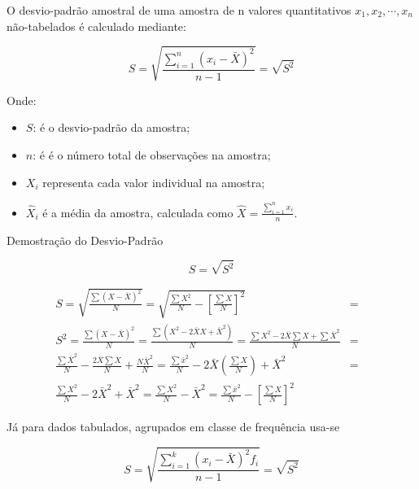 O desvio-padrão amostral de uma amostra de n valores quantitativos $x_{1}, x_{2}, \cdots, x_{n}$ não-tabelados é calculado mediante:

\begin{equation}\label{dp}
    S = \sqrt{\frac{\sum_{i=1}^{n}(x_{i}-\bar{X})^{2}}{n-1}} = \sqrt{S^{2}}
\end{equation}

Onde:

\begin{itemize}
    \item $S$: é o desvio-padrão da amostra;
    \item $n$: é é o número total de observações na amostra;
    \item $X_{i}$ representa cada valor individual na amostra;
    \item $\hat{X}_{i}$ é a média da amostra, calculada como $\hat{X}=\frac{\sum_{i=1}^{n} x_{i}}{n}$.
\end{itemize}
\vskip0.3cm



\newpage
Demostração do Desvio-Padrão

$$
S = \sqrt{S^{2}}
$$


\begin{eqnarray}\nonumber
 S = \sqrt{\frac{\sum(X-\bar{X})^2}{N}} = \sqrt{\frac{\sum X^{2}}{N}- \left[ \frac{\sum X}{N} \right] ^2}     & = &  \\ \nonumber
 S^{2} = \frac{\sum (X-\bar{X})^2}{N}  = \frac{\sum(X^{2}-2\bar{X}X+\bar{X}^{2})}{N} = \frac{\sum X^{2}-2\bar{X}\sum X + \sum \bar{X}^{2} }{N}   & = &  \\ 
\frac{\sum \bar{X}^{2} }{N} - \frac{2 \bar{X} \sum X}{N} + \frac{N \bar{X}^{2}}{N}  = 
\frac{\sum \bar{x}^{2}}{N} - 2 \bar{X} \left(\frac{\sum X}{N} \right) + \bar{X}^{2}  & = &  \\ \nonumber
\frac{\sum X^{2}}{N} - 2\bar{X}^{2} + \bar{X}^{2} =  \frac{\sum X^{2}}{N} - \bar{X}^{2} =  \frac{\sum \bar{x}^{2}}{N} -  \left[ \frac{\sum X}{N} \right]^{2}  \nonumber
\end{eqnarray}






Já para dados tabulados, agrupados em classe de frequência usa-se

\begin{equation}\label{dp}
    S = \sqrt{\frac{\sum_{i=1}^{k}(x_{i}-\bar{X})^{2}f_{i}}{n-1}} = \sqrt{S^{2}}
\end{equation}

